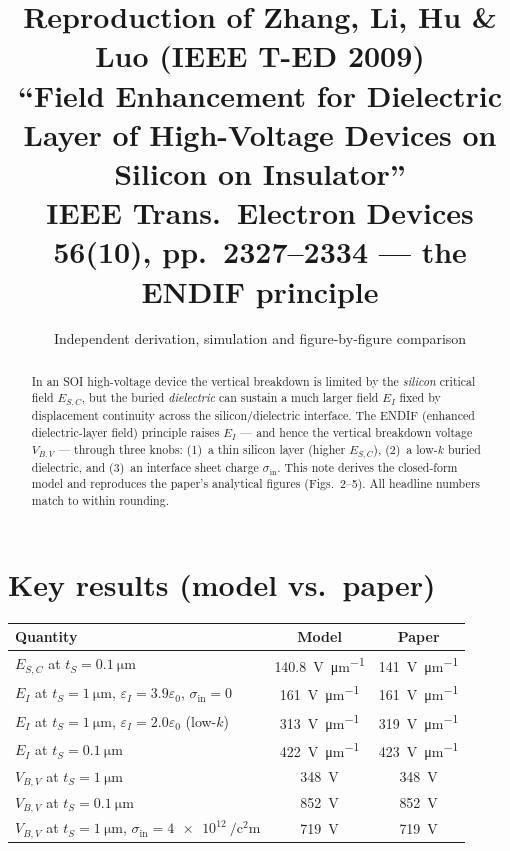 \documentclass[11pt]{article}
\title{\vspace{-1.2cm}\textbf{Reproduction of Zhang, Li, Hu \& Luo (IEEE T-ED 2009)}\\[4pt]
\large ``Field Enhancement for Dielectric Layer of High-Voltage Devices on
Silicon on Insulator''\\ \normalsize IEEE Trans.\ Electron Devices \textbf{56}(10),
pp.~2327--2334 --- the ENDIF principle}
\author{Independent derivation, simulation and figure-by-figure comparison}
\date{}
\newcommand{\ESC}{E_{S,C}}
\newcommand{\EI}{E_{I}}
\newcommand{\VBV}{V_{B,V}}
\newcommand{\epsI}{\varepsilon_{I}}
\newcommand{\sigin}{\sigma_{\mathrm{in}}}
\newcommand{\tS}{t_{S}}
\begin{document}
\maketitle
\vspace{-0.8cm}

\begin{abstract}
\noindent In an SOI high-voltage device the vertical breakdown is limited by the
\emph{silicon} critical field $\ESC$, but the buried \emph{dielectric} can sustain
a much larger field $\EI$ fixed by displacement continuity across the
silicon/dielectric interface. The ENDIF (enhanced dielectric-layer field)
principle raises $\EI$ --- and hence the vertical breakdown voltage $\VBV$ ---
through three knobs: (1)~a thin silicon layer (higher $\ESC$), (2)~a low-$k$
buried dielectric, and (3)~an interface sheet charge $\sigin$. This note derives
the closed-form model and reproduces the paper's analytical figures (Figs.~2--5).
All headline numbers match to within rounding.
\end{abstract}

\section*{Key results (model vs.\ paper)}
\begin{center}
\begin{tabular}{@{}lcc@{}}
\toprule
Quantity & Model & Paper \\
\midrule
$\ESC$ at $\tS=\SI{0.1}{\micro\meter}$ & \SI{140.8}{\volt\per\micro\meter} & \SI{141}{\volt\per\micro\meter} \\
$\EI$ at $\tS=\SI{1}{\micro\meter}$, $\epsI=3.9\varepsilon_0$, $\sigin=0$ & \SI{161}{\volt\per\micro\meter} & \SI{161}{\volt\per\micro\meter} \\
$\EI$ at $\tS=\SI{1}{\micro\meter}$, $\epsI=2.0\varepsilon_0$ (low-$k$) & \SI{313}{\volt\per\micro\meter} & \SI{319}{\volt\per\micro\meter} \\
$\EI$ at $\tS=\SI{0.1}{\micro\meter}$ & \SI{422}{\volt\per\micro\meter} & \SI{423}{\volt\per\micro\meter} \\
$\VBV$ at $\tS=\SI{1}{\micro\meter}$ & \SI{348}{\volt} & \SI{348}{\volt} \\
$\VBV$ at $\tS=\SI{0.1}{\micro\meter}$ & \SI{852}{\volt} & \SI{852}{\volt} \\
$\VBV$ at $\tS=\SI{1}{\micro\meter}$, $\sigin=\SI{4e12}{\per\square\centi\meter}$ & \SI{719}{\volt} & \SI{719}{\volt} \\
\bottomrule
\end{tabular}
\end{center}
\end{document}
